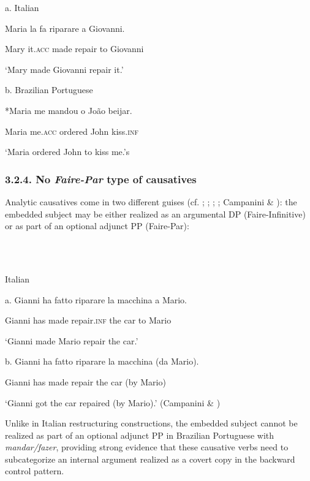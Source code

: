 \documentclass[output=paper]{langsci/langscibook}
\begin{document}
          a.   Italian

    Maria la  fa   riparare a  Giovanni.        

Mary it.\textsc{acc}  made  repair    to Giovanni 

‘Mary made Giovanni repair it.’

b.  Brazilian Portuguese

*Maria me        mandou o João beijar.

Maria   me.\textsc{acc} ordered John    kiss.\textsc{inf}

‘Maria ordered John to kiss me.’s

\subsubsection{ 3.2.4. No \textit{Faire-Par} type of causatives}

Analytic causatives come in two different guises (cf. \citealt{Kayne1975}; \citealt{Huber1980}; \citealt{Burzio1986}; \citealt{Enzinger2010}; Campanini \& \citealt{Pitteroff2012}): the embedded subject may be either realized as an argumental DP  (Faire-Infinitive) or as part of an optional adjunct PP (Faire-Par):

\ea%
    \label{ex:moreno:18}
    \gll\\
        \\
    \glt
    \z

           Italian

a.  Gianni ha  fatto   riparare    la   macchina a Mario.

Gianni has made repair.\textsc{inf} the car    to Mario 

‘Gianni made Mario repair the car.’

b.  Gianni ha fatto    riparare   la  macchina   (da Mario). 

Gianni has made repair   the car  (by Mario) 

‘Gianni got the car repaired (by Mario).’ (Campanini \& \citealt{Pitteroff2012})

Unlike in Italian restructuring constructions, the embedded subject cannot be realized as part of an optional adjunct PP in Brazilian Portuguese with \textit{mandar/fazer}, providing strong evidence that these causative verbs need to subcategorize an internal argument realized as a covert copy in the backward control pattern. 

\ea%
    \label{ex:moreno:19}
    \gll\\
        \\
    \glt
    \z
\end{document}
